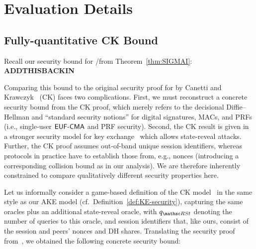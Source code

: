 \section{Evaluation Details}
\label{apx:evaluation}

\subsection{Fully-quantitative CK \SIGMA Bound}
\label{apx:evaluation:CK-bound}

Recall our security bound for \SIGMA/\SIGMAI from Theorem~\ref{thm:SIGMAI}:
{\color{red}\textbf{ADDTHISBACKIN}}

Comparing this bound%
to the original security proof for \SIGMA by Canetti and Krawczyk~\cite{C:CanKra02} (CK) faces two complications.
First, we must reconstruct a concrete security bound from the CK proof, which merely refers to the decisional Diffie--Hellman and ``standard security notions'' for digital signatures, MACs, and PRFs (i.e., single-user $\mathsf{EUF{\text{\normalfont-}}CMA}$ and PRF security).
Second, the CK result is given in a stronger security model for key exchange~\cite{EC:CanKra01} which allows state-reveal attacks.
Further, the CK proof assumes out-of-band unique session identifiers, whereas protocols in practice have to establish those from, e.g., nonces (introducing a corresponding collision bound as in our analysis).
We are therefore inherently constrained to compare qualitatively different security properties here.

Let us informally consider a game-based definition of the CK model~\cite{EC:CanKra01} in the same style as our AKE model (cf.\ Definition~\ref{def:KE-security}), capturing the same oracles plus an additional state-reveal oracle, with $\qRevState$ denoting the number of queries to this oracle, and session identifiers that, like ours, consist of the session and peers' nonces and DH shares.
Translating the \SIGMAI security proof from~\cite[Theorem~6 in the full version]{C:CanKra02}, we obtained the following concrete security bound:

